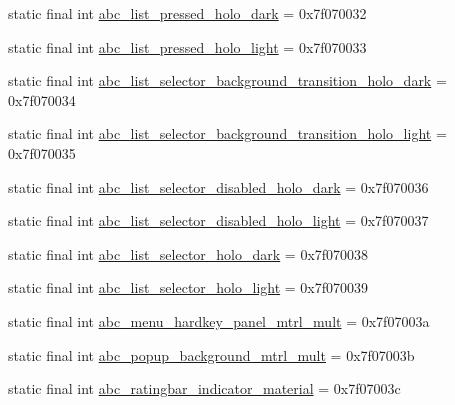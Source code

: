 \begin{DoxyCompactItemize}
\item 
static final int \mbox{\hyperlink{classandroid_1_1support_1_1design_1_1_r_1_1drawable_ab1e6fcec42423709d799d8f6a7e21059}{abc\+\_\+list\+\_\+pressed\+\_\+holo\+\_\+dark}} = 0x7f070032
\item 
static final int \mbox{\hyperlink{classandroid_1_1support_1_1design_1_1_r_1_1drawable_ab0cef3e2b1fc7aa0bf2c1988bfeaca30}{abc\+\_\+list\+\_\+pressed\+\_\+holo\+\_\+light}} = 0x7f070033
\item 
static final int \mbox{\hyperlink{classandroid_1_1support_1_1design_1_1_r_1_1drawable_a7f756d25e913e1c3d2bd87d82265fb46}{abc\+\_\+list\+\_\+selector\+\_\+background\+\_\+transition\+\_\+holo\+\_\+dark}} = 0x7f070034
\item 
static final int \mbox{\hyperlink{classandroid_1_1support_1_1design_1_1_r_1_1drawable_acdc506ea7e02796a9ad1948d4e592b75}{abc\+\_\+list\+\_\+selector\+\_\+background\+\_\+transition\+\_\+holo\+\_\+light}} = 0x7f070035
\item 
static final int \mbox{\hyperlink{classandroid_1_1support_1_1design_1_1_r_1_1drawable_a94c12f905a060bba7d244eed598e1461}{abc\+\_\+list\+\_\+selector\+\_\+disabled\+\_\+holo\+\_\+dark}} = 0x7f070036
\item 
static final int \mbox{\hyperlink{classandroid_1_1support_1_1design_1_1_r_1_1drawable_aeb140628ca835dff330e6f2e32de04a7}{abc\+\_\+list\+\_\+selector\+\_\+disabled\+\_\+holo\+\_\+light}} = 0x7f070037
\item 
static final int \mbox{\hyperlink{classandroid_1_1support_1_1design_1_1_r_1_1drawable_a8aa940b01e43683a84407c10ca9ff622}{abc\+\_\+list\+\_\+selector\+\_\+holo\+\_\+dark}} = 0x7f070038
\item 
static final int \mbox{\hyperlink{classandroid_1_1support_1_1design_1_1_r_1_1drawable_a928d3309d523c1fffb1ce9477b7c9b72}{abc\+\_\+list\+\_\+selector\+\_\+holo\+\_\+light}} = 0x7f070039
\item 
static final int \mbox{\hyperlink{classandroid_1_1support_1_1design_1_1_r_1_1drawable_a338da0e1d3f5fe94baec6d62b4af2673}{abc\+\_\+menu\+\_\+hardkey\+\_\+panel\+\_\+mtrl\+\_\+mult}} = 0x7f07003a
\item 
static final int \mbox{\hyperlink{classandroid_1_1support_1_1design_1_1_r_1_1drawable_a44c8316321e929db60908ab6003732f7}{abc\+\_\+popup\+\_\+background\+\_\+mtrl\+\_\+mult}} = 0x7f07003b
\item 
static final int \mbox{\hyperlink{classandroid_1_1support_1_1design_1_1_r_1_1drawable_ae24e6883b3e33d0e1268295286114968}{abc\+\_\+ratingbar\+\_\+indicator\+\_\+material}} = 0x7f07003c

\end{DoxyCompactItemize}
